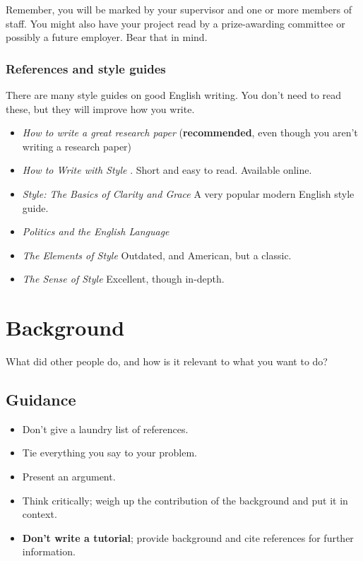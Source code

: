\documentclass{l4proj}
\begin{document}
Remember, you will be marked by your supervisor and one or more members
of staff. You might also have your project read by a prize-awarding
committee or possibly a future employer. Bear that in mind.

\subsection{References and style guides}
There are many style guides on good English writing. You don't need to
read these, but they will improve how you write.

\begin{itemize}
\item
  \emph{How to write a great research paper} \cite{Pey17} (\textbf{recommended}, even though you aren't writing a research paper)
\item
\emph{How to Write with Style} \cite{Von80}. Short and easy to read. Available online.
\item
\emph{Style: The Basics of Clarity and Grace} \cite{Wil09} A very popular modern English style guide.
\item
\emph{Politics and the English Language} \cite{Orw68}  
\item
\emph{The Elements of Style} \cite{StrWhi07} Outdated, and
  American, but a classic.
\item
  \emph{The Sense of Style} \cite{Pin15} Excellent, though in-depth.


\end{itemize}
\chapter{Background}
What did other people do, and how is it relevant to what you want to do?
\section{Guidance}
\begin{itemize}    
    \item
      Don't give a laundry list of references.
    \item
      Tie everything you say to your problem.
    \item
      Present an argument.
    \item Think critically; weigh up the contribution of the background and put it in context.    
    \item
      \textbf{Don't write a tutorial}; provide background and cite
      references for further information.
\end{itemize}
\end{document}
